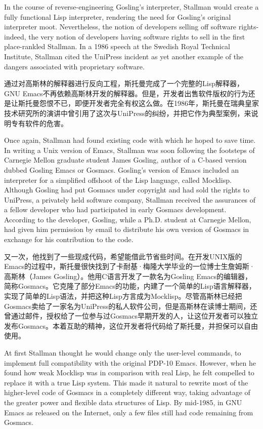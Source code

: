 \fi

\ifdefined\eng
In the course of reverse-engineering Gosling's interpreter, Stallman would create a fully functional Lisp interpreter, rendering the need for Gosling's original interpreter moot. Nevertheless, the notion of developers selling off software rights-indeed, the very notion of developers having software rights to sell in the first place-rankled Stallman. In a 1986 speech at the Swedish Royal Technical Institute, Stallman cited the UniPress incident as yet another example of the dangers associated with proprietary software.
\fi

\ifdefined\chs
通过对高斯林的解释器进行反向工程，斯托曼完成了一个完整的Lisp解释器，GNU Emacs不再依赖高斯林开发的解释器。但是，开发者出售软件版权的行为还是让斯托曼怨恨不已，即便开发者完全有权这么做。在1986年，斯托曼在瑞典皇家技术研究所的演讲中曾引用了这次与UniPress的纠纷，并把它作为典型案例，来说明专有软件的危害。
\fi

\fi
\ifdefined\vtwo
\ifdefined\eng
Once again, Stallman had found existing code with which he hoped to save time. In writing a Unix version of Emacs, Stallman was soon following the footsteps of Carnegie Mellon graduate student James Gosling, author of a C-based version dubbed Gosling Emacs or Gosmacs. Gosling's version of Emacs included an interpreter for a simplified offshoot of the Lisp language, called Mocklisp. Although Gosling had put Gosmacs under copyright and had sold the rights to UniPress, a privately held software company, Stallman received the assurances of a fellow developer who had participated in early Gosmacs development. According to the developer, Gosling, while a Ph.D. student at Carnegie Mellon, had given him permission by email to distribute his own version of Gosmacs in exchange for his contribution to the code.
\fi

\ifdefined\chs
又一次，他找到了一些现成代码，希望能借此节省些时间。在开发UNIX版的Emacs的过程中，斯托曼很快找到了卡耐基·梅隆大学毕业的一位博士生詹姆斯·高斯林（James Gosling）。他用C语言开发了一款名为Gosling Emacs的编辑器，简称Gosmacs。它克隆了部分Emacs的功能，内建了一个简单的Lisp语言解释器，实现了简单的Lisp语法，并把这种Lisp方言成为Mocklisp。尽管高斯林已经把Gosmacs卖给了一家名为UniPress的私人软件公司，但是高斯林在读博士期间，还曾通过邮件，授权给了一位参与过Gosmacs早期开发的人，让这位开发者可以独立发布Gosmacs。本着互助的精神，这位开发者将代码给了斯托曼，并担保可以自由使用。
\fi

\ifdefined\eng
At first Stallman thought he would change only the user-level commands, to implement full compatibility with the original PDP-10 Emacs.  However, when he found how weak Mocklisp was in comparison with real Lisp, he felt compelled to replace it with a true Lisp system.  This made it natural to rewrite most of the higher-level code of Gosmacs in a completely different way, taking advantage of the greater power and flexible data structures of Lisp.  By mid-1985, in GNU Emacs as released on the Internet, only a few files still had code remaining from Gosmacs.
\fi

